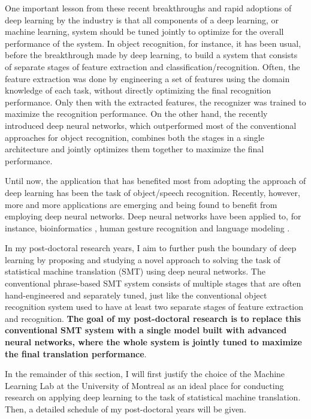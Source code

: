 \documentclass[11pt, oneside]{essay}
\begin{document}
One important lesson from these recent breakthroughs and rapid
adoptions of deep learning by the industry is that all components
of a deep learning, or machine learning, system should be tuned
jointly to optimize for the overall performance of the system. In
object recognition, for instance, it has been usual, before the
breakthrough made by deep learning, to build a system that
consists of separate stages of feature extraction and
classification/recognition. Often, the feature extraction was
done by engineering a set of features using the domain knowledge
of each task, without directly optimizing the final recognition
performance. Only then with the extracted features, the
recognizer was trained to maximize the recognition performance.
On the other hand, the recently introduced deep neural networks,
which outperformed most of the conventional approaches for
object recognition, combines both the stages in a single
architecture and jointly optimizes them together to maximize
the final performance.

Until now, the application that has benefited most from adopting
the approach of deep learning has been the task of object/speech
recognition. Recently, however, more and more applications are
emerging and being found to benefit from employing deep neural
networks. Deep neural networks have been applied to, for
instance, bioinformatics \citep[see, e.g.,][]{Lena2012}, human
gesture recognition \citep[see, e.g.,][]{Cho2014} and language
modeling \citep[see, e.g.,][]{Mikolov2010,Bengio2003}.

In my post-doctoral research years, I aim to further push the
boundary of deep learning by proposing and studying a novel
approach to solving the task of statistical machine translation
(SMT) using deep neural networks. The conventional phrase-based
SMT system \citep{Koehn2003,Marcu2002} consists of multiple
stages that are often hand-engineered and separately tuned, just
like the conventional object recognition system used to have at
least two separate stages of feature extraction and recognition.
\textbf{The goal of my post-doctoral research is to replace
this conventional SMT system with a single model built with
advanced neural networks, where the whole system is jointly
tuned to maximize the final translation performance}.

In the remainder of this section, I will first justify the choice
of the Machine Learning Lab at the University of Montreal as an
ideal place for conducting research on applying deep learning to
the task of statistical machine translation. Then, a detailed
schedule of my post-doctoral years will be given.
\end{document}
